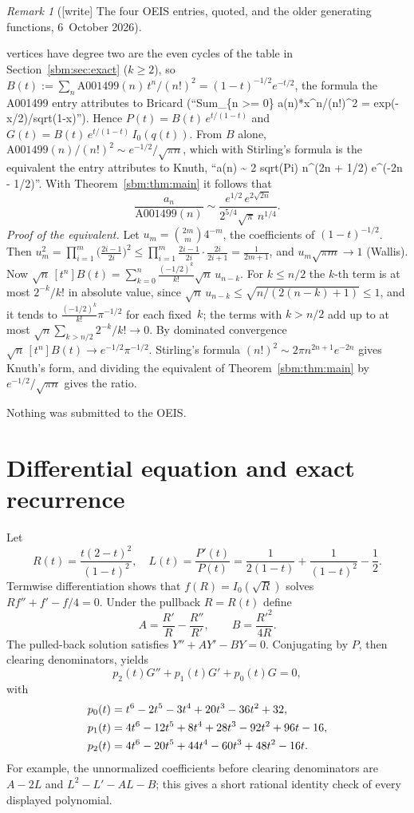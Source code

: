 \documentclass[11pt,letterpaper]{article}
\numberwithin{equation}{section}
\theoremstyle{remark}\newtheorem{remark}[theorem]{Remark}
\begin{document}
\begin{remark}[{[write]} The four OEIS entries, quoted, and the older generating functions, 6~October 2026]
\begin{enumerate}
 vertices have degree two are the even cycles of the table in
 Section~\ref{sbm:sec:exact} ($k\ge2$), so
 $B(t):=\sum_n\mathrm{A001499}(n)\,t^n/(n!)^2=(1-t)^{-1/2}e^{-t/2}$, the
 formula the A001499 entry attributes to Bricard
 (``Sum\_\{n >= 0\} a(n)*x\^{}n/(n!)\^{}2 = exp(-x/2)/sqrt(1-x)''). Hence
 $P(t)=B(t)\,e^{t/(1-t)}$ and $G(t)=B(t)\,e^{t/(1-t)}\,I_0(q(t))$. From $B$
 alone, $\mathrm{A001499}(n)/(n!)^2\sim e^{-1/2}/\sqrt{\pi n}$, which with
 Stirling's formula is the equivalent the entry attributes to Knuth,
 ``a(n) \textasciitilde{} 2 sqrt(Pi) n\^{}(2n + 1/2) e\^{}(-2n - 1/2)''. With
 Theorem~\ref{sbm:thm:main} it follows that
 \[
  \frac{a_n}{\mathrm{A001499}(n)}\sim
  \frac{e^{1/2}\,e^{2\sqrt{2n}}}{2^{5/4}\sqrt\pi\,n^{1/4}} .
 \]
 \emph{Proof of the equivalent.} Let $u_m=\binom{2m}m4^{-m}$, the
 coefficients of $(1-t)^{-1/2}$. Then
 $u_m^2=\prod_{i=1}^m\bigl(\frac{2i-1}{2i}\bigr)^2
 \le\prod_{i=1}^m\frac{2i-1}{2i}\cdot\frac{2i}{2i+1}=\frac1{2m+1}$, and
 $u_m\sqrt{\pi m}\to1$ (Wallis). Now
 $\sqrt n\,[t^n]B(t)=\sum_{k=0}^n\frac{(-1/2)^k}{k!}\sqrt n\,u_{n-k}$. For
 $k\le n/2$ the $k$-th term is at most $2^{-k}/k!$ in absolute value, since
 $\sqrt n\,u_{n-k}\le\sqrt{n/(2(n-k)+1)}\le1$, and it tends to
 $\frac{(-1/2)^k}{k!}\pi^{-1/2}$ for each fixed~$k$; the terms with $k>n/2$
 add up to at most $\sqrt n\sum_{k>n/2}2^{-k}/k!\to0$. By dominated
 convergence $\sqrt n\,[t^n]B(t)\to e^{-1/2}\pi^{-1/2}$. Stirling's formula
 $(n!)^2\sim2\pi n^{2n+1}e^{-2n}$ gives Knuth's form, and dividing the
 equivalent of Theorem~\ref{sbm:thm:main} by $e^{-1/2}/\sqrt{\pi n}$ gives
 the ratio.
\end{enumerate}
Nothing was submitted to the OEIS.
\end{remark}

\section{Differential equation and exact recurrence}\label{sbm:sec:ode}
Let
\[
 R(t)=\frac{t(2-t)^2}{(1-t)^2},\quad
 L(t)=\frac{P'(t)}{P(t)}=\frac1{2(1-t)}+\frac1{(1-t)^2}-\frac12.
\]
Termwise differentiation shows that $f(R)=I_0(\sqrt R)$ solves
$Rf''+f'-f/4=0$. Under the pullback $R=R(t)$ define
\[
 A=\frac{R'}R-\frac{R''}{R'},\qquad B=\frac{R'^2}{4R}.
\]
The pulled-back solution satisfies $Y''+AY'-BY=0$. Conjugating by
$P$, then clearing denominators, yields
\begin{equation}\label{sbm:eq:ode}
 p_2(t)G''+p_1(t)G'+p_0(t)G=0,
\end{equation}
with
\begin{align}\label{sbm:eq:poly}
 p_0(t)&=t^6-2t^5-3t^4+20t^3-36t^2+32,\notag\\
 p_1(t)&=4t^6-12t^5+8t^4+28t^3-92t^2+96t-16,\\
 p_2(t)&=4t^6-20t^5+44t^4-60t^3+48t^2-16t.\notag
\end{align}
For example, the unnormalized coefficients before clearing
 denominators are $A-2L$ and $L^2-L'-AL-B$; this gives a short rational
identity check of every displayed polynomial.
\end{document}
